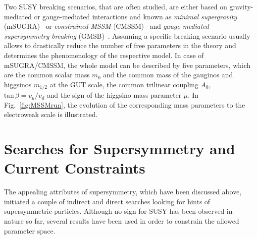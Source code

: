 Two SUSY breaking scenarios, that are often studied, are either based on gravity-mediated or gauge-mediated interactions and known as \textit{minimal supergravity} (mSUGRA)~\cite{Chamseddine:1982jx, AlvarezGaume:1983gj} or \textit{constrained MSSM} (CMSSM)~\cite{Kane:1993td, Baer:2002gm} and \textit{gauge-mediated supersymmetry breaking} (GMSB)~\cite{Dine:1981gu, AlvarezGaume:1981wy}. Assuming a specific breaking scenario usually allows to drastically reduce the number of free parameters in the theory and determines the phenomenology of the respective model. In case of mSUGRA/CMSSM, the whole model can be described by five parameters, which are the common scalar mass $m_0$ and the common mass of the gauginos and higgsinos $m_{1/2}$ at the GUT scale, the common trilinear coupling $A_0$, $\mathrm{tan} \, \beta = v_u/v_d$ and the sign of the higgsino mass parameter $\mu$. In Fig.~\ref{fig:MSSMrun}, the evolution of the corresponding mass parameters to the electroweak scale is illustrated.  

\section{Searches for Supersymmetry and Current Constraints}
\label{sec:susy_status}
The appealing attributes of supersymmetry, which have been discussed above, initiated a couple of indirect and direct searches looking for hints of supersymmetric particles. Although no sign for SUSY has been observed in nature so far, several results have been used in order to constrain the allowed parameter space. %

